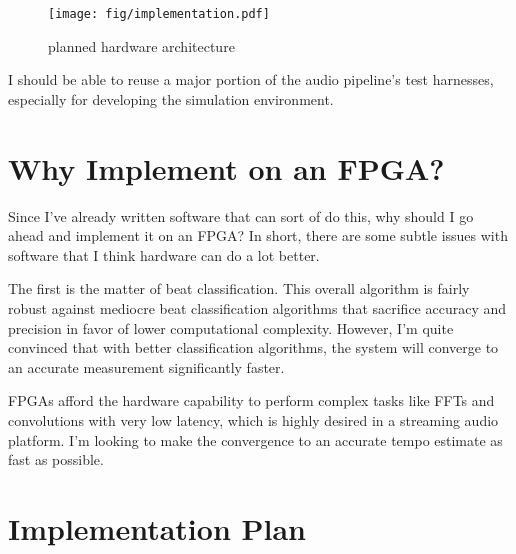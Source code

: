 \documentclass[letterpaper]{article}
\begin{document}
    \begin{figure}
        \centering
        \texttt{[image: fig/implementation.pdf]}
        \caption{planned hardware architecture}
        \label{fig:implementation}
    \end{figure}

    I should be able to reuse a major portion of the audio pipeline's test
    harnesses, especially for developing the simulation environment.


\section{Why Implement on an FPGA?}

    Since I've already written software that can sort of do this, why should I
    go ahead and implement it on an FPGA?  In short, there are some subtle
    issues with software that I think hardware can do a lot better.

    The first is the matter of beat classification.  This overall algorithm is
    fairly robust against mediocre beat classification algorithms that
    sacrifice accuracy and precision in favor of lower computational
    complexity.  However, I'm quite convinced that with better classification
    algorithms, the system will converge to an accurate measurement
    significantly faster.

    FPGAs afford the hardware capability to perform complex tasks like FFTs and
    convolutions with very low latency, which is highly desired in a streaming
    audio platform.  I'm looking to make the convergence to an accurate tempo
    estimate as fast as possible. 

    
\section{Implementation Plan}
    
\end{document}

